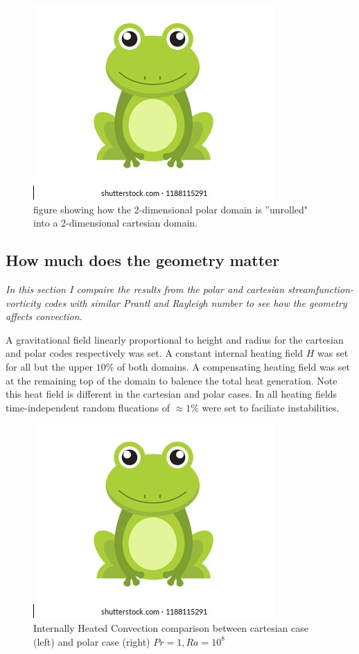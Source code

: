 \documentclass{article}
\begin{document}
\begin{figure}[h!]
	\centering
	\includegraphics{frog.png}
	\caption{figure showing how the 2-dimensional polar domain is ''unrolled" into a 2-dimensional cartesian domain.}
	\label{unrolling}
\end{figure}

\subsection*{How much does the geometry matter}
{\it{In this section I compaire the results from the polar and cartesian streamfunction-vorticity codes with similar Prantl and Rayleigh number to see how the geometry affects convection.}}

A gravitational field linearly proportional to height and radius for the 
cartesian and polar codes respectively was set. A constant internal 
heating field $H$ was set for all but the upper $10 \%$ of both domains. A 
compensating heating field was set at the remaining top of the domain to 
balence the total heat generation. Note this heat field is different in 
the cartesian and polar cases. In all heating fields time-independent 
random flucations of $\approx 1 \%$ were set to faciliate instabilities.

\begin{figure}
	\centering
	\includegraphics{frog.png}
	\caption{Internally Heated Convection comparison between cartesian 
	case (left) and polar case (right) $Pr=1, Ra=10^8$}
	\label{cartesian vs polar}
\end{figure}
\end{document}
